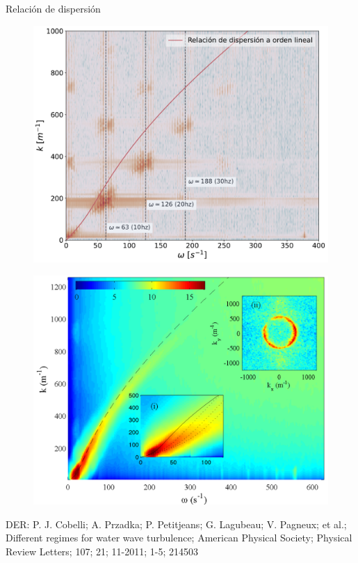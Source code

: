 \documentclass[aspectratio=169]{beamer}
\begin{document}
\begin{frame}{Relación de dispersión} %
	\begin{minipage}{0.46\textwidth}
	  \begin{figure}
		  \centering
	    \includegraphics[width=\linewidth]{figs/dispersion_relation.pdf}
	  \end{figure}
	\end{minipage} \hfill
	\begin{minipage}{0.46\textwidth}
		\pause
	  \begin{figure}
	    \includegraphics[width=\linewidth]{figs/dispersion_relation_cobelli.png}
	  \end{figure}
	\end{minipage}

	\vfill
	\tiny DER: P. J. Cobelli; A. Przadka; P. Petitjeans; G. Lagubeau; V. Pagneux; et al.; Different regimes for water wave turbulence; American Physical Society; Physical Review Letters; 107; 21; 11-2011; 1-5; 214503
\end{frame}
\end{document}

